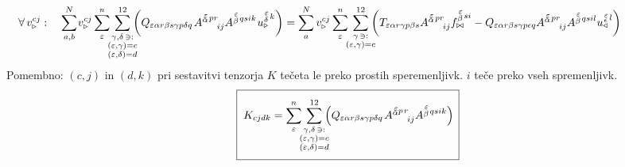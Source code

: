 \begin{equation}
   \hspace{-18mm}
   \forall \, v^{c j}_{\triangleright}: \quad
   \sum^N_{a,b} \mkern-2mu v^{c  j}_{\triangleright}
   \sum^n_\varepsilon
   \mkern-7mu
   \sum_{\substack{\gamma, \delta \, \ni: \\
      (\varepsilon,\gamma) = c \\ (\varepsilon,\delta) = d}}^{12}
   \mkern-10mu
   \qty(
   Q_{\varepsilon   \alpha r   \beta s   \gamma p   \delta q} \mkern2mu
   A^{\substack{\mkern2mu \varepsilon \\[-0.65mm] \alpha} \mkern2mu p r}_{\mkern29mu i j}
   A^{\substack{\mkern2mu \varepsilon \\[0.05mm] \beta} \mkern2mu q s i k} \mkern1mu
   u^{\substack{\mkern2mu \varepsilon \\[0.09mm] \delta} \mkern2mu k}_\triangleright )
   =
   \sum^N_a v^{c j}_{\triangleright}
   \sum^n_\varepsilon
   \mkern-7mu
   \sum_{\substack{\gamma \, \ni: \\ (\varepsilon,\gamma) = c}}^{12}
   \mkern-10mu
   \qty(
   T_{\varepsilon   \alpha r   \gamma p   \beta s}
   A^{\substack{\mkern2mu \varepsilon \\[-0.65mm] \alpha} \mkern2mu p r}_{\mkern29mu i j}
   f^{\substack{\mkern2mu \varepsilon \\[0.05mm] \beta} \mkern2mu s i}_{\bowtie}
   -
   Q_{\varepsilon   \alpha r   \beta s   \gamma p   \epsilon q}
   A^{\substack{\mkern2mu \varepsilon \\[-0.65mm] \alpha} \mkern2mu p r}_{\mkern29mu i j}
   A^{\substack{\mkern2mu \varepsilon \\[0.05mm] \beta} \mkern2mu q s i l}
   u^{\substack{\mkern2mu \varepsilon \\[-0.55mm] \epsilon} \mkern2mu l}_\triangleleft )
\end{equation}
Pomembno: $(c, j)$ in $(d, k)$ pri sestavitvi tenzorja $K$ tečeta le preko prostih speremenljivk. $i$ teče preko vseh spremenljivk.
\begin{equation}
   \boxed{ \phantom{\rule[-12mm]{1mm}{20mm}}
   K_{cjdk} =
   \sum^n_\varepsilon
   \mkern-7mu
   \sum_{\substack{\gamma, \delta \, \ni: \\
      (\varepsilon,\gamma) = c \\ (\varepsilon,\delta) = d}}^{12}
   \mkern-10mu
   \qty(
   Q_{\varepsilon   \alpha r   \beta s   \gamma p   \delta q} \mkern2mu
   A^{\substack{\mkern2mu \varepsilon \\[-0.65mm] \alpha} p \mkern2mu r}_{\mkern29mu i j}
   A^{\substack{\mkern2mu \varepsilon \\[0.05mm] \beta} \mkern2mu  q s i k} ) \mkern3mu }
\end{equation}
